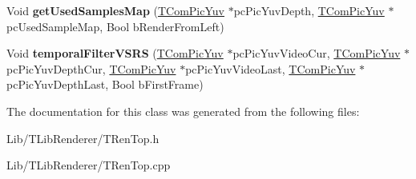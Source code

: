 \begin{DoxyCompactItemize}
\item 
\mbox{\label{class_t_ren_top_acfde89f3f5289f2ffab2f04aab3986ea}} 
Void {\bfseries get\+Used\+Samples\+Map} (\hyperlink{class_t_com_pic_yuv}{T\+Com\+Pic\+Yuv} $\ast$pc\+Pic\+Yuv\+Depth, \hyperlink{class_t_com_pic_yuv}{T\+Com\+Pic\+Yuv} $\ast$pc\+Used\+Sample\+Map, Bool b\+Render\+From\+Left)
\item 
\mbox{\label{class_t_ren_top_a0a52b1049d94c1e1a1bae06b8dcc6bc5}} 
Void {\bfseries temporal\+Filter\+V\+S\+RS} (\hyperlink{class_t_com_pic_yuv}{T\+Com\+Pic\+Yuv} $\ast$pc\+Pic\+Yuv\+Video\+Cur, \hyperlink{class_t_com_pic_yuv}{T\+Com\+Pic\+Yuv} $\ast$pc\+Pic\+Yuv\+Depth\+Cur, \hyperlink{class_t_com_pic_yuv}{T\+Com\+Pic\+Yuv} $\ast$pc\+Pic\+Yuv\+Video\+Last, \hyperlink{class_t_com_pic_yuv}{T\+Com\+Pic\+Yuv} $\ast$pc\+Pic\+Yuv\+Depth\+Last, Bool b\+First\+Frame)
\end{DoxyCompactItemize}


The documentation for this class was generated from the following files\+:\begin{DoxyCompactItemize}
\item 
Lib/\+T\+Lib\+Renderer/T\+Ren\+Top.\+h\item 
Lib/\+T\+Lib\+Renderer/T\+Ren\+Top.\+cpp\end{DoxyCompactItemize}
